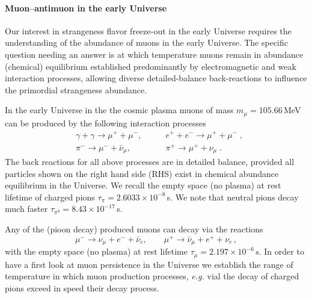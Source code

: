 \paragraph{Muon–antimuon in the early Universe}\label{section_muon}
%
Our interest in strangeness flavor freeze-out in the early Universe requires the understanding of the abundance of muons in the early Universe. The specific question needing an answer is at which temperature muons remain in abundance (chemical) equilibrium established predominantly by electromagnetic and weak interaction processes, allowing diverse detailed-balance back-reactions to influence the primordial strangeness abundance.

In the early Universe in the the cosmic plasma muons of mass $m_\mu=105.66$\,MeV can be produced by the following interaction processes
\begin{align} 
&\gamma+\gamma\longrightarrow\mu^++\mu^-,\qquad & e^++e^-\longrightarrow \mu^++\mu^-\;,\\
&\pi^-\longrightarrow\mu^-+\bar{\nu}_\mu,\qquad & \pi^+\longrightarrow\mu^++\nu_\mu\;.
\end{align}
The back reactions for all above processes are in detailed balance, provided all particles shown on the right hand side (RHS) exist in chemical abundance equilibrium in the Universe. We recall the empty space (no plasma) at rest lifetime of charged pions $\tau_\pi=2.6033\times 10^{-8}$\,s. We note that neutral pions decay much faster $\tau_{\pi^0}=8.43\times 10^{-17}$\,s.

Any of the (pioon decay) produced muons can decay via the reactions
\begin{equation}
\mu^-\rightarrow\nu_\mu+e^-+\bar{\nu}_e,\qquad \mu^+\rightarrow\bar{\nu}_\mu+e^++\nu_e\,,
\end{equation} 
with the empty space (no plasma) at rest lifetime $\tau_{\mu}=2.197 \times 10^{-6}\,\mathrm{s}$. In order to have a first look at muon persistence in the Universe we establish the range of temperature in which muon production processes, {\it e.g.} vial the decay of charged pions exceed in speed their decay process.
 
